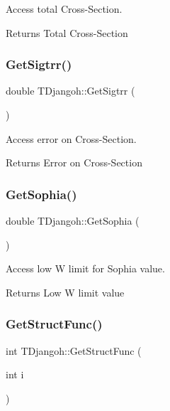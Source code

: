 Access total Cross-\/\+Section. 

\begin{DoxyReturn}{Returns}
Total Cross-\/\+Section 
\end{DoxyReturn}
\mbox{\label{class_t_djangoh_af888193a486499c7b019b0da80eae760}} 
\subsubsection{\texorpdfstring{Get\+Sigtrr()}{GetSigtrr()}}
{\footnotesize\ttfamily double T\+Djangoh\+::\+Get\+Sigtrr (\begin{DoxyParamCaption}{ }\end{DoxyParamCaption})}



Access error on Cross-\/\+Section. 

\begin{DoxyReturn}{Returns}
Error on Cross-\/\+Section 
\end{DoxyReturn}
\mbox{\label{class_t_djangoh_a31acc70811ad58a8986f7d04547e9213}} 
\subsubsection{\texorpdfstring{Get\+Sophia()}{GetSophia()}}
{\footnotesize\ttfamily double T\+Djangoh\+::\+Get\+Sophia (\begin{DoxyParamCaption}{ }\end{DoxyParamCaption})}



Access low W limit for Sophia value. 

\begin{DoxyReturn}{Returns}
Low W limit value 
\end{DoxyReturn}
\mbox{\label{class_t_djangoh_a58e1925539d208ca8e00533b5ae52074}} 
\subsubsection{\texorpdfstring{Get\+Struct\+Func()}{GetStructFunc()}}
{\footnotesize\ttfamily int T\+Djangoh\+::\+Get\+Struct\+Func (\begin{DoxyParamCaption}\item[{int}]{i }\end{DoxyParamCaption})}



